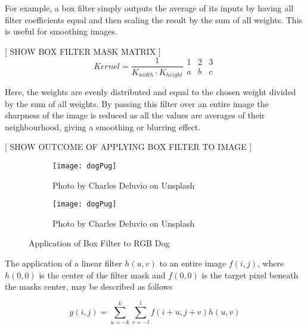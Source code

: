 For example, a box filter simply outputs the average of its inputs by having all filter coefficients equal and then scaling the result by the sum of all weights. This is useful for smoothing images.

[ SHOW BOX FILTER MASK MATRIX ]
  \begin{equation}
    Kernel  = \frac{1}{K_{width} \cdotp K_{height}}
    \begin{matrix}
    1 & 2 & 3\\
    a & b & c
      \end{matrix}
  \end{equation}

Here, the weights are evenly distributed and equal to the chosen weight divided by the sum of all weights. By passing this filter over an entire image the sharpness of the image is reduced as all the values are averages of their neighbourhood, giving a smoothing or blurring effect.

[ SHOW OUTCOME OF APPLYING BOX FILTER TO IMAGE  ]

\begin{figure}[ht!]
  \centering
  \begin{subfigure}[b]{0.5\linewidth}
    \centering\texttt{[image: dogPug]}
    \caption{Photo by Charles Deluvio on Unsplash}
    \label{fig:roughDog}
  \end{subfigure}
  \begin{subfigure}[b]{0.5\linewidth}
    \centering\texttt{[image: dogPug]}
    \caption{Photo by Charles Deluvio on Unsplash}
    \label{smoothDog}
  \end{subfigure}
  \caption{Application of Box Filter to RGB Dog}
  \label{fig:dogPug}
\end{figure}

The application of a linear filter $h(u,v)$ to an entire image $f(i,j)$, where $h(0,0)$ is the center of the filter mask and $f(0,0)$ is the target pixel beneath the masks center, may be described as follows

\begin{equation} \label{eq:1}
g(i,j) = \sum_{u=-k}^{k}\sum_{v = -l}^{l}f(i+u,j+v)h(u,v)
\end{equation}


